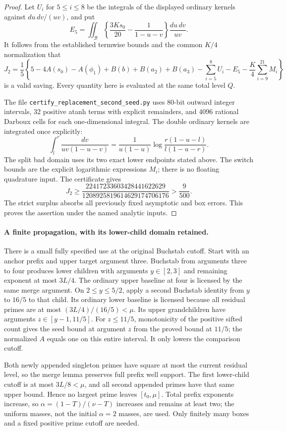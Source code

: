 \documentclass[11pt]{article}
\begin{document}
\begin{proof}
Let $U_i$ for $5\le i\le8$ be the integrals of the displayed ordinary
kernels against $du\,dv/(uv)$, and put
\[
 E_5=\iint_{\mathcal B}
 \left\{\frac{3Ks_0}{20}-\frac1{1-u-v}\right\}\frac{du\,dv}{uv}.
\]
It follows from the established termwise bounds and the common
$K/4$ normalization that
\[
 J_2=\frac15\left\{5-4A(s_0)-A(\phi_1)
       +B(b)+B(a_2)+B(a_3)-\sum_{i=5}^8U_i-E_5
                         -\frac K4\sum_{i=9}^{21}M_i\right\}
\]
is a valid saving.  Every quantity here is evaluated at the same
total level $Q$.

The file \texttt{certify\_replacement\_second\_seed.py} uses 80-bit
outward integer intervals, 32 positive atanh terms with explicit
remainders, and 4096 rational Darboux cells for each one-dimensional
integral.  The double ordinary kernels are integrated once explicitly:
\[
 \int_l^r\frac{dv}{uv(1-u-v)}
  =\frac1{u(1-u)}\log\frac{r(1-u-l)}{l(1-u-r)}.
\]
The split bad domain uses its two exact lower endpoints stated above.
The switch bounds are the explicit logarithmic expressions $M_i$;
there is no floating quadrature input.  The certificate gives
\[
 J_2\ge
 \frac{22417233603428441622629}{1208925819614629174706176}
 >\frac9{500}.
\]
The strict surplus absorbs all previously fixed asymptotic and box
errors.  This proves the assertion under the named analytic inputs.
\end{proof}

\paragraph{A finite propagation, with its lower-child domain retained.}
There is a small fully specified use at the original Buchstab cutoff.
Start with an anchor prefix and upper target argument three.  Buchstab
from arguments three to four produces lower children with arguments
$y\in[2,3]$ and remaining exponent at most $3L/4$.
The ordinary upper baseline at four is licensed by the same merge
argument.  On $2\le y\le5/2$, apply a second Buchstab identity from
$y$ to $16/5$ to that child.  Its ordinary lower baseline is licensed
because all residual primes are at most
$(3L/4)/(16/5)<\mu$.  Its upper grandchildren have arguments
$z\in[y-1,11/5]$.
For $z\le11/5$, monotonicity of the positive sifted count gives the
seed bound at argument $z$ from the proved bound at $11/5$;
the normalized $A$ equals one on this entire interval.
It only lowers the comparison cutoff.

Both newly appended singleton primes have square at most the current
residual level, so the merge lemma preserves full prefix well support.
The first lower-child cutoff is at most $3L/8<\mu$, and all second
appended primes have that same upper bound.  Hence no largest prime
leaves $[t_0,\mu]$.  Total prefix exponents increase, so
$\alpha=(1-T)/(\nu-T)$ increases and remains at least two;
the uniform masses, not the initial $\alpha=2$ masses, are used.
Only finitely many boxes and a fixed positive prime cutoff are needed.
\end{document}

